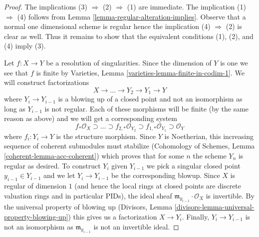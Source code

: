 \documentclass[10pt,a4paper]{amsart}
\theoremstyle{plain}
\theoremstyle{definition}
\theoremstyle{remark}
\numberwithin{equation}{subsection}
\begin{document}
\begin{proof}
The implications (3) $\Rightarrow$ (2) $\Rightarrow$ (1) are immediate.
The implication (1) $\Rightarrow$ (4) follows from
Lemma \ref{lemma-regular-alteration-implies}.
Observe that a normal one dimensional scheme is regular hence
the implication (4) $\Rightarrow$ (2) is clear as well.
Thus it remains to show that the equivalent conditions (1), (2), and
(4) imply (3).

\medskip\noindent
Let $f : X \to Y$ be a resolution of singularities. Since the dimension
of $Y$ is one we see that $f$ is finite by
Varieties, Lemma \ref{varieties-lemma-finite-in-codim-1}.
We will construct factorizations
$$
X \to \ldots \to Y_2 \to Y_1 \to Y
$$
where $Y_i \to Y_{i - 1}$ is a blowing up of a closed point and not
an isomorphism as long as $Y_{i - 1}$ is not regular.
Each of these morphisms will be finite (by the same
reason as above) and we will get a corresponding system
$$
f_*\mathcal{O}_X \supset \ldots \supset
f_{2, *}\mathcal{O}_{Y_2} \supset
f_{1, *}\mathcal{O}_{Y_1} \supset \mathcal{O}_Y
$$
where $f_i : Y_i \to Y$ is the structure morphism.
Since $Y$ is Noetherian, this increasing sequence of coherent submodules
must stabilize
(Cohomology of Schemes, Lemma \ref{coherent-lemma-acc-coherent})
which proves that for some $n$ the scheme $Y_n$ is regular
as desired. To construct $Y_i$ given $Y_{i - 1}$ we pick a singular
closed point $y_{i - 1} \in Y_{i - 1}$ and we let $Y_i \to Y_{i - 1}$
be the corresponding blowup. Since $X$ is regular of dimension $1$
(and hence the local rings at closed points are discrete valuation
rings and in particular PIDs), the ideal sheaf
$\mathfrak m_{y_{i - 1}} \cdot \mathcal{O}_X$ is invertible.
By the universal property of blowing up (Divisors, Lemma
\ref{divisors-lemma-universal-property-blowing-up})
this gives us a factorization
$X \to Y_i$.
Finally, $Y_i \to Y_{i - 1}$ is not an isomorphism as
$\mathfrak m_{y_{i - 1}}$ is not an invertible ideal.
\end{proof}
\end{document}
